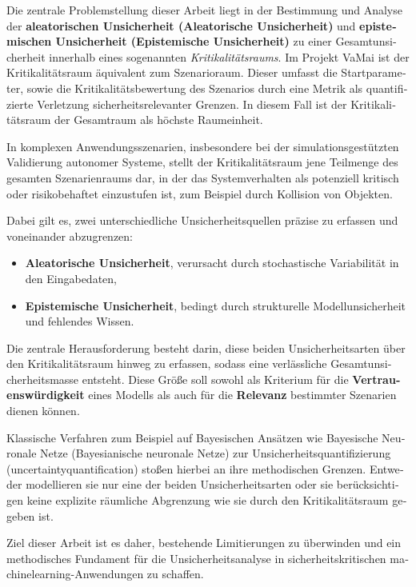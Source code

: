 \begin{otherlanguage}{ngerman}
Die zentrale Problemstellung dieser Arbeit liegt in der Bestimmung und Analyse der \textbf{aleatorischen Unsicherheit (\gls{Aleatorische Unsicherheit})} und \textbf{epistemischen Unsicherheit (\gls{Epistemische Unsicherheit})} zu einer Gesamtunsicherheit innerhalb eines sogenannten \emph{Kritikalitätsraums}. Im Projekt VaMai ist der Kritikalitätsraum äquivalent zum Szenarioraum. Dieser umfasst die Startparameter, sowie die Kritikalitätsbewertung des Szenarios durch eine Metrik als quantifizierte Verletzung sicherheitsrelevanter Grenzen. In diesem Fall ist der Kritikalitätsraum der Gesamtraum als höchste Raumeinheit. \newline


In komplexen Anwendungsszenarien, insbesondere bei der simulationsgestützten Validierung autonomer Systeme, stellt der Kritikalitätsraum jene Teilmenge des gesamten Szenarienraums dar, in der das Systemverhalten als potenziell kritisch oder risikobehaftet einzustufen ist, zum Beispiel durch Kollision von Objekten.\newline

Dabei gilt es, zwei unterschiedliche Unsicherheitsquellen präzise zu erfassen und voneinander abzugrenzen:

\begin{itemize}
  \item \textbf{\gls{Aleatorische Unsicherheit}}, verursacht durch stochastische Variabilität in den Eingabedaten,
  \item \textbf{\gls{Epistemische Unsicherheit}}, bedingt durch strukturelle Modellunsicherheit und fehlendes Wissen.
\end{itemize}

Die zentrale Herausforderung besteht darin, diese beiden Unsicherheitsarten über den Kritikalitätsraum hinweg zu erfassen, sodass eine verlässliche Gesamtunsicherheitsmasse entsteht. Diese Größe soll sowohl als Kriterium für die \textbf{Vertrauenswürdigkeit} eines Modells als auch für die \textbf{Relevanz} bestimmter Szenarien dienen können.\newline

Klassische Verfahren zum Beispiel auf Bayesischen Ansätzen wie Bayesische Neuronale Netze (\gls{Bayesianische neuronale Netze}) zur Unsicherheitsquantifizierung (\gls{uncertaintyquantification}) stoßen hierbei an ihre methodischen Grenzen. Entweder modellieren sie nur eine der beiden Unsicherheitsarten oder sie berücksichtigen keine explizite räumliche Abgrenzung wie sie durch den Kritikalitätsraum gegeben ist.\newline

Ziel dieser Arbeit ist es daher, bestehende Limitierungen zu überwinden und ein methodisches Fundament für die Unsicherheitsanalyse in sicherheitskritischen \gls{machinelearning}-Anwendungen zu schaffen.



\end{otherlanguage}
